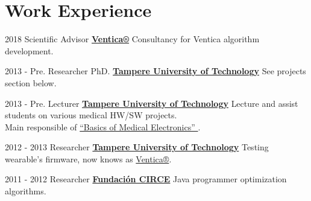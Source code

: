 \documentclass[letterpaper]{twentysecondcv} %
\begin{document}
\makeprofile %




\section{Work Experience}        
\begin{twenty}
	\twentyitem
    	{2018}
        {Scientific Advisor}
        {\href{https://www.ventica.net/}{\textbf{Ventica®}}}
        {}%
        {Consultancy for Ventica algorithm development.}

	\twentyitem
    	{2013 - Pre.}
        {Researcher PhD.}
        {\href{https://www.tut.fi/}{\textbf{Tampere University of Technology}}}
        {}%
        {See projects section below.} 
        
	\twentyitem
    	{2013 - Pre.}
        {Lecturer}
        {\href{https://www.tut.fi/}{\textbf{Tampere University of Technology}}}
        {}%
        {Lecture and assist students on various medical HW/SW projects.  
        \\ Main responsible of 
\href{https://www.youtube.com/watch?time_continue=1&v=E3D8rAG6S4Q}{“Basics of Medical Electronics” }.
        }

	\twentyitem
    	{2012 - 2013}
        {Researcher}
        {\href{https://www.tut.fi/}{\textbf{Tampere University of Technology}}}
         {}%
        {Testing wearable's firmware, now knows as \href{https://www.ventica.net/}{Ventica®}.   }

	\twentyitem
    	{2011 - 2012}
        {Researcher}
        {\href{https://http://www.fcirce.es//}{\textbf{Fundaci\'on CIRCE}}}
        {}%
        {Java programmer optimization algorithms.}
\end{twenty}


\end{document}
